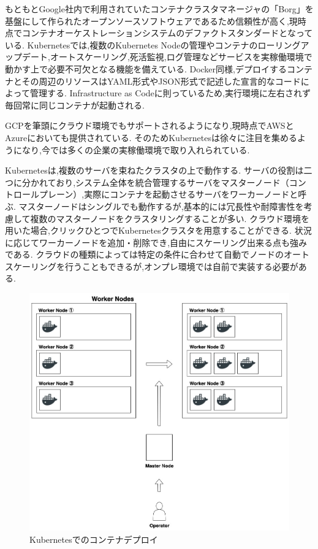もともとGoogle社内で利用されていたコンテナクラスタマネージャの「Borg」を基盤にして作られたオープンソースソフトウェアであるため信頼性が高く,現時点でコンテナオーケストレーションシステムのデファクトスタンダードとなっている.
Kubernetesでは,複数のKubernetes Nodeの管理やコンテナのローリングアップデート,オートスケーリング,死活監視,ログ管理などサービスを実稼働環境で動かす上で必要不可欠となる機能を備えている.
Docker同様,デプロイするコンテナとその周辺のリソースはYAML形式やJSON形式で記述した宣言的なコードによって管理する.
Infrastructure as Codeに則っているため,実行環境に左右されず毎回常に同じコンテナが起動される.

GCPを筆頭にクラウド環境でもサポートされるようになり,現時点でAWSとAzureにおいても提供されている.
そのためKubernetesは徐々に注目を集めるようになり,今では多くの企業の実稼働環境で取り入れられている.

Kubernetesは,複数のサーバを束ねたクラスタの上で動作する.
サーバの役割は二つに分かれており,システム全体を統合管理するサーバをマスターノード（コントロールプレーン）,実際にコンテナを起動させるサーバをワーカーノードと呼ぶ.
マスターノードはシングルでも動作するが,基本的には冗長性や耐障害性を考慮して複数のマスターノードをクラスタリングすることが多い.
クラウド環境を用いた場合,クリックひとつでKubernetesクラスタを用意することができる.
状況に応じてワーカーノードを追加・削除でき,自由にスケーリング出来る点も強みである.
クラウドの種類によっては特定の条件に合わせて自動でノードのオートスケーリングを行うこともできるが,オンプレ環境では自前で実装する必要がある.

\begin{figure}[htbp]
\begin{center}
    \includegraphics[width=\textwidth]{./figures/k8s-deploy-container.jpg}
    \caption{Kubernetesでのコンテナデプロイ}
\end{center}
\end{figure}

